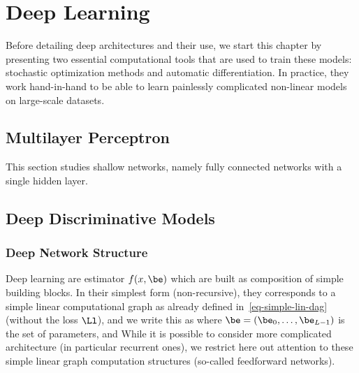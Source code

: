 
\chapter{Deep Learning}
\label{c-deep-learning}



Before detailing deep architectures and their use, we start this chapter by presenting two essential computational tools that are used to train these models: stochastic optimization methods and automatic differentiation. In practice, they work hand-in-hand to be able to learn painlessly complicated non-linear models on large-scale datasets. 

\section{Multilayer Perceptron}
\label{sec-mlp}

This section studies shallow networks, namely fully connected networks with a single hidden layer. 




\section{Deep Discriminative Models}
\label{sec-deepnet-discr}

\subsection{Deep Network Structure}
\label{sec-deep-structure}

Deep learning are estimator $f(x,\be)$ which are built as composition of simple building blocks.
%
In their simplest form (non-recursive), they corresponds to a simple linear computational graph as already defined in~\eqref{eq-simple-lin-dag} (without the loss $\Ll$), and we write this as
where $\be=(\be_0,\ldots,\be_{L-1})$ is the set of parameters, and 
%
While it is possible to consider more complicated architecture (in particular recurrent ones), we restrict here out attention to these simple linear graph computation structures (so-called feedforward networks).

